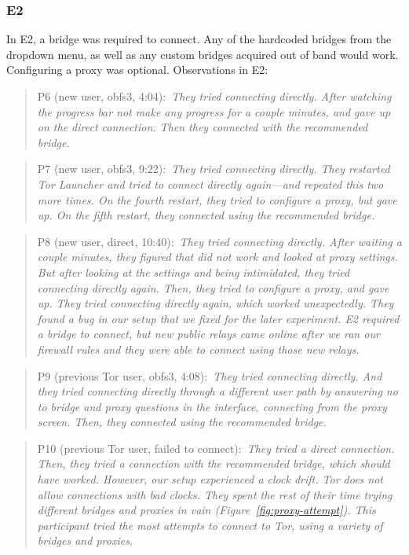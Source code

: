 \documentclass[USenglish,oneside,twocolumn]{article}
\newcommand{\pquote}[2]{
\begin{quotation}
\noindent #1:~\textit{#2}
\end{quotation}
}
\begin{document}
\subsubsection{E2} 
In E2, a bridge was required to connect. Any of the hardcoded bridges from the dropdown menu, as well as any custom bridges acquired out of band would work. Configuring a proxy was optional.
Observations in E2: 

\pquote{P6 (new user, obfs3, 4:04)}{They tried connecting directly. After watching the progress bar not make any progress for a couple minutes, and gave up on the direct connection. Then they connected with the recommended bridge.}

\pquote{P7 (new user, obfs3, 9:22)}{They tried connecting directly. They restarted Tor Launcher and tried to connect directly again---and repeated this two more times. On the fourth restart, they tried to configure a proxy, but gave up. On the fifth restart, they connected using the recommended bridge.}

\pquote{P8 (new user, direct, 10:40)}{They tried connecting directly. After waiting a couple minutes, they figured that did not work and looked at proxy settings. But after looking at the settings and being intimidated, they tried connecting directly again. Then, they tried to configure a proxy, and gave up. They tried connecting directly again, which worked unexpectedly. They found a bug in our setup that we fixed for the later experiment. E2 required a bridge to connect, but new public relays came online after we ran our firewall rules and they were able to connect using those new relays. }

\pquote{P9 (previous Tor user, obfs3, 4:08)}{They tried connecting directly. And they tried connecting directly through a different user path by answering no to bridge and proxy questions in the interface, connecting from the proxy screen. Then, they connected using the recommended bridge.}

\pquote{P10 (previous Tor user, failed to connect)}{They tried a direct connection. Then, they tried a connection with the recommended bridge, which should have worked. However, our setup experienced a clock drift. Tor does not allow connections with bad clocks. They spent the rest of their time trying different bridges and proxies in vain (Figure~\ref{fig:proxy-attempt}). This participant tried the most attempts to connect to Tor, using a variety of bridges and proxies.}
\end{document}
